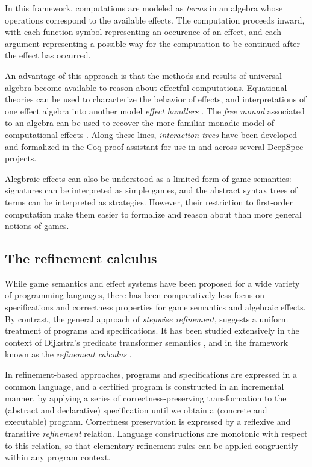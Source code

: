 \documentclass[11pt,oneside,draft]{book}
\theoremstyle{definition}
\begin{document}
In this framework,
computations are modeled as \emph{terms}
in an algebra whose operations correspond to
the available effects. %
The computation proceeds inward,
with each function symbol representing an occurence of an effect,
and each argument representing a possible way
for the computation to be continued
after the effect has occurred.

An advantage of this approach is that
the methods and results of universal algebra
become available to reason about effectful computations.
Equational theories can be used to characterize
the behavior of effects, and interpretations
of one effect algebra into another model
\emph{effect handlers} \citep{eff}.
The \emph{free monad} associated to an algebra
can be used to recover the more familiar
monadic model of computational effects \citep{monads}.
Along these lines,
\emph{interaction trees} \citep{itree}
have been developed
and formalized in the Coq proof assistant
for use in and across
several DeepSpec projects.

Alegbraic effects can also be understood as
a limited form of game semantics:
signatures can be interpreted as simple games,
and the abstract syntax trees of terms
can be interpreted as strategies.
However,
their restriction to first-order computation
make them easier to formalize and reason about
than more general notions of games.



\subsection{The refinement calculus} %

While game semantics
and effect systems
have been proposed
for a wide variety of programming languages,
there has been comparatively less focus
on specifications and correctness properties
for game semantics and algebraic effects.
By contrast,
the general approach of \emph{stepwise refinement},
suggests a uniform treatment of programs and specifications.
It has been studied extensively in the context of
Dijkstra's predicate transformer semantics \citep{gc}, and
in the framework known as the \emph{refinement calculus} \citep{refcal}.

In refinement-based approaches,
programs and specifications are expressed in a common language,
and a certified program is constructed in an incremental manner,
by applying a series of correctness-preserving transformation
to the (abstract and declarative) specification
until we obtain a (concrete and executable) program.
Correctness preservation is expressed
by a reflexive and transitive \emph{refinement} relation.
Language constructions are monotonic with respect to this relation,
so that elementary refinement rules
can be applied congruently within any program context.
\end{document}
